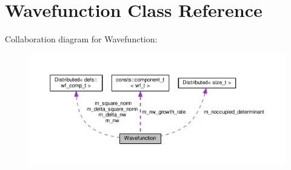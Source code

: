 \hypertarget{classWavefunction}{}\section{Wavefunction Class Reference}
\label{classWavefunction}


Collaboration diagram for Wavefunction\+:
\nopagebreak
\begin{figure}[H]
\begin{center}
\leavevmode
\includegraphics[width=350pt]{classWavefunction__coll__graph}
\end{center}
\end{figure}
